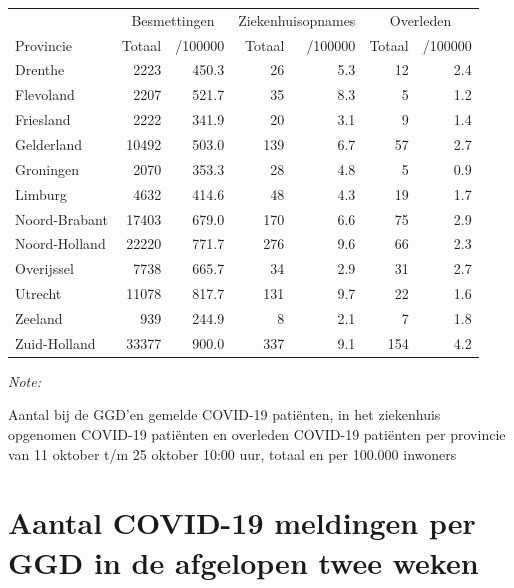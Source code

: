 \documentclass[
  english,
  man,floatsintext]{apa6}
\begin{document}
\begin{table}[H]
\centering
\begin{threeparttable}
\begin{tabular}{lrrrrrr}
\toprule
\multicolumn{1}{c}{ } & \multicolumn{2}{c}{Besmettingen} & \multicolumn{2}{c}{Ziekenhuisopnames} & \multicolumn{2}{c}{Overleden} \\
\cmidrule(l{3pt}r{3pt}){2-3} \cmidrule(l{3pt}r{3pt}){4-5} \cmidrule(l{3pt}r{3pt}){6-7}
Provincie & Totaal & /100000 & Totaal & /100000 & Totaal & /100000\\
\midrule
Drenthe & 2223 & 450.3 & 26 & 5.3 & 12 & 2.4\\
Flevoland & 2207 & 521.7 & 35 & 8.3 & 5 & 1.2\\
Friesland & 2222 & 341.9 & 20 & 3.1 & 9 & 1.4\\
Gelderland & 10492 & 503.0 & 139 & 6.7 & 57 & 2.7\\
Groningen & 2070 & 353.3 & 28 & 4.8 & 5 & 0.9\\
Limburg & 4632 & 414.6 & 48 & 4.3 & 19 & 1.7\\
Noord-Brabant & 17403 & 679.0 & 170 & 6.6 & 75 & 2.9\\
Noord-Holland & 22220 & 771.7 & 276 & 9.6 & 66 & 2.3\\
Overijssel & 7738 & 665.7 & 34 & 2.9 & 31 & 2.7\\
Utrecht & 11078 & 817.7 & 131 & 9.7 & 22 & 1.6\\
Zeeland & 939 & 244.9 & 8 & 2.1 & 7 & 1.8\\
Zuid-Holland & 33377 & 900.0 & 337 & 9.1 & 154 & 4.2\\
\bottomrule
\end{tabular}
\begin{tablenotes}
\item \textit{Note: } 
\item Aantal bij de GGD’en gemelde COVID-19 patiënten, in het ziekenhuis opgenomen COVID-19 patiënten en overleden COVID-19 patiënten per provincie van 11 oktober t/m 25 oktober 10:00 uur, totaal en per 100.000 inwoners
\end{tablenotes}
\end{threeparttable}
\end{table}

\newpage

\hypertarget{aantal-covid-19-meldingen-per-ggd-in-de-afgelopen-twee-weken}{%
\section{Aantal COVID-19 meldingen per GGD in de afgelopen twee weken}\label{aantal-covid-19-meldingen-per-ggd-in-de-afgelopen-twee-weken}}
\end{document}

